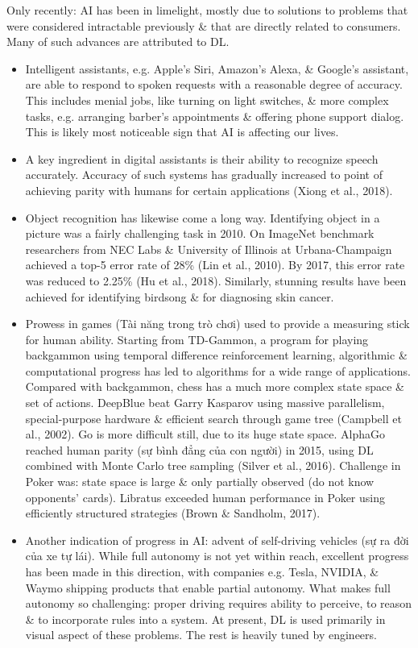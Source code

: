 \documentclass{article}
\begin{document}
\begin{itemize}
\begin{itemize}
		Only recently: AI has been in limelight, mostly due to solutions to problems that were considered intractable previously \& that are directly related to consumers. Many of such advances are attributed to DL.
		\begin{itemize}
			\item Intelligent assistants, e.g. Apple's Siri, Amazon's Alexa, \& Google's assistant, are able to respond to spoken requests with a reasonable degree of accuracy. This includes menial jobs, like turning on light switches, \& more complex tasks, e.g. arranging barber's appointments \& offering phone support dialog. This is likely most noticeable sign that AI is affecting our lives.
			\item A key ingredient in digital assistants is their ability to recognize speech accurately. Accuracy of such systems has gradually increased to point of achieving parity with humans for certain applications (Xiong et al., 2018).
			\item Object recognition has likewise come a long way. Identifying object in a picture was a fairly challenging task in 2010. On ImageNet benchmark researchers from NEC Labs \& University of Illinois at Urbana-Champaign achieved a top-5 error rate of 28\% (Lin et al., 2010). By 2017, this error rate was reduced to 2.25\% (Hu et al., 2018). Similarly, stunning results have been achieved for identifying birdsong \& for diagnosing skin cancer.
			\item Prowess in games (Tài năng trong trò chơi) used to provide a measuring stick for human ability. Starting from TD-Gammon, a program for playing backgammon using temporal difference reinforcement learning, algorithmic \& computational progress has led to algorithms for a wide range of applications. Compared with backgammon, chess has a much more complex state space \& set of actions. DeepBlue beat {\sc Garry Kasparov} using massive parallelism, special-purpose hardware \& efficient search through game tree (Campbell et al., 2002). Go is more difficult still, due to its huge state space. AlphaGo reached human parity (sự bình đẳng của con người) in 2015, using DL combined with Monte Carlo tree sampling (Silver et al., 2016). Challenge in Poker was: state space is large \& only partially observed (do not know opponents' cards). Libratus exceeded human performance in Poker using efficiently structured strategies (Brown \& Sandholm, 2017).
			\item Another indication of progress in AI: advent of self-driving vehicles (sự ra đời của xe tự lái). While full autonomy is not yet within reach, excellent progress has been made in this direction, with companies e.g. Tesla, NVIDIA, \& Waymo shipping products that enable partial autonomy. What makes full autonomy so challenging: proper driving requires ability to perceive, to reason \& to incorporate rules into a system. At present, DL is used primarily in visual aspect of these problems. The rest is heavily tuned by engineers.

\end{itemize}
\end{itemize}
\end{itemize}
\end{document}
